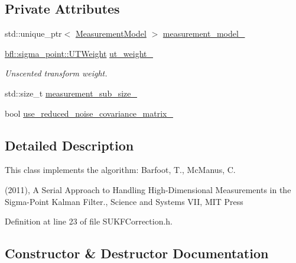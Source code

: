 \subsection*{Private Attributes}
\begin{DoxyCompactItemize}
\item 
std\+::unique\+\_\+ptr$<$ \mbox{\hyperlink{classbfl_1_1MeasurementModel}{Measurement\+Model}} $>$ \mbox{\hyperlink{classbfl_1_1SUKFCorrection_a78fcc3b8a9f377898c424613cb7365c6}{measurement\+\_\+model\+\_\+}}
\item 
\mbox{\hyperlink{structbfl_1_1sigma__point_1_1UTWeight}{bfl\+::sigma\+\_\+point\+::\+U\+T\+Weight}} \mbox{\hyperlink{classbfl_1_1SUKFCorrection_aee8ef14b7af58d05f57eb22cbe951ef3}{ut\+\_\+weight\+\_\+}}
\begin{DoxyCompactList}\small\item\em Unscented transform weight. \end{DoxyCompactList}\item 
std\+::size\+\_\+t \mbox{\hyperlink{classbfl_1_1SUKFCorrection_a669bac317d875f6e5df0695a7d6b2277}{measurement\+\_\+sub\+\_\+size\+\_\+}}
\item 
bool \mbox{\hyperlink{classbfl_1_1SUKFCorrection_a2eb05f0dbcb8ae4a3983d995f8145c44}{use\+\_\+reduced\+\_\+noise\+\_\+covariance\+\_\+matrix\+\_\+}}
\end{DoxyCompactItemize}


\subsection{Detailed Description}
This class implements the algorithm\+: Barfoot, T., Mc\+Manus, C. 

(2011), \textquotesingle{}A Serial Approach to Handling High-\/\+Dimensional Measurements in the Sigma-\/\+Point Kalman Filter.\textquotesingle{}, Science and Systems V\+II, M\+IT Press 

Definition at line 23 of file S\+U\+K\+F\+Correction.\+h.



\subsection{Constructor \& Destructor Documentation}
\mbox{\label{classbfl_1_1SUKFCorrection_aa841c803f97b575565f978f062cea9c1}} 
